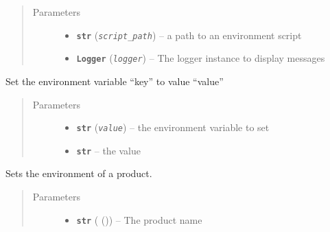 \documentclass[a4paper,10pt,english]{sphinxmanual}
\begin{document}
\begin{fulllineitems}
\begin{fulllineitems}
\begin{description}
\end{description}
\begin{quote}\begin{description}
\item[{Parameters}] \leavevmode\begin{itemize}
\item {} 
\textbf{\texttt{str}} (\emph{\texttt{script\_path}}) -- a path to an environment script

\item {} 
\textbf{\texttt{Logger}} (\emph{\texttt{logger}}) -- The logger instance to display messages

\end{itemize}

\end{description}\end{quote}

\end{fulllineitems}


\begin{fulllineitems}
\label{commands/apidoc/src:src.environment.SalomeEnviron.set}
Set the environment variable ``key'' to value ``value''
\begin{quote}\begin{description}
\item[{Parameters}] \leavevmode\begin{itemize}
\item {} 
\textbf{\texttt{str}} (\emph{\texttt{value}}) -- the environment variable to set

\item {} 
\textbf{\texttt{str}} -- the value

\end{itemize}

\end{description}\end{quote}

\end{fulllineitems}


\begin{fulllineitems}
\label{commands/apidoc/src:src.environment.SalomeEnviron.set_a_product}
Sets the environment of a product.
\begin{quote}\begin{description}
\item[{Parameters}] \leavevmode\begin{itemize}
\item {} 
\textbf{\texttt{str}} ({\hyperref[commands/apidoc/src:module\string-src.product]{}} ()) -- The product name


\end{itemize}
\end{description}
\end{quote}
\end{fulllineitems}
\end{fulllineitems}
\end{document}
